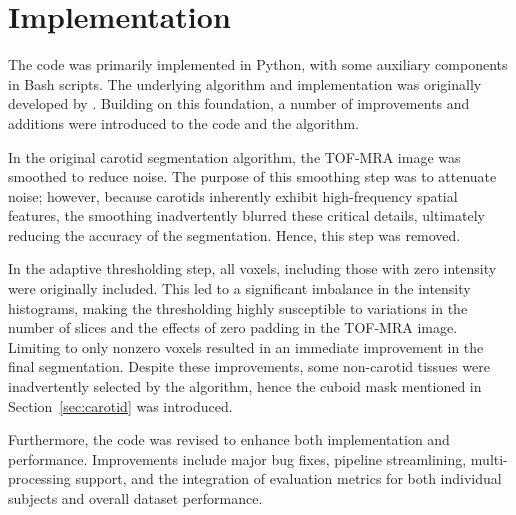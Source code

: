 \section{Implementation}
The code was primarily implemented in Python, with some auxiliary components in Bash scripts.
The underlying algorithm and implementation was originally developed by \citeauthor{irace2021bayesian} \cite{irace2021bayesian}. Building on this foundation, a number of improvements and additions were introduced to the code and the algorithm.

In the original carotid segmentation algorithm, the TOF-MRA image was smoothed to reduce noise.
The purpose of this smoothing step was to attenuate noise; however, because carotids inherently exhibit high-frequency spatial features, the smoothing inadvertently blurred these critical details, ultimately reducing the accuracy of the segmentation.
Hence, this step was removed.

In the adaptive thresholding step, all voxels, including those with zero intensity were originally included.
This led to a significant imbalance in the intensity histograms, making the thresholding highly susceptible to variations in the number of slices and the effects of zero padding in the TOF-MRA image.
Limiting to only nonzero voxels resulted in an immediate improvement in the final segmentation.
Despite these improvements, some non-carotid tissues were inadvertently selected by the algorithm, hence the cuboid mask mentioned in Section~\ref{sec:carotid} was introduced.

Furthermore, the code was revised to enhance both implementation and performance.
Improvements include major bug fixes, pipeline streamlining, multi-processing support, and the integration of evaluation metrics for both individual subjects and overall dataset performance.
